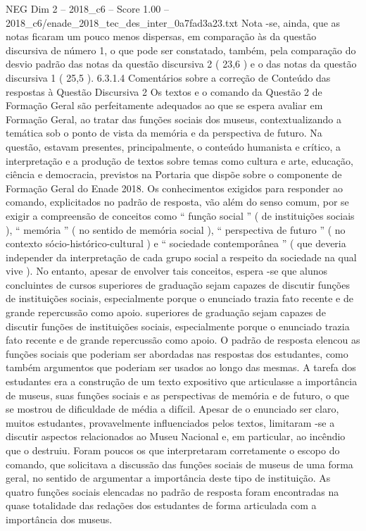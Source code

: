 \begin{textsample}{NEG Dim 2 – 2018\_c6 – Score 1.00 – 2018\_c6/enade\_2018\_tec\_des\_inter\_0a7fad3a23.txt}
Nota -se, ainda, que as notas ficaram um pouco menos dispersas, em comparação às da questão discursiva de número 1, o que pode ser constatado, também, pela comparação do desvio padrão das notas da questão discursiva 2 ( 23,6 ) e o das notas da questão discursiva 1 ( 25,5 ). 6.3.1.4 Comentários sobre a correção de Conteúdo das respostas à Questão Discursiva 2 Os textos e o comando da Questão 2 de Formação Geral são perfeitamente adequados ao que se espera avaliar em Formação Geral, ao tratar das funções sociais dos museus, contextualizando a temática sob o ponto de vista da memória e da perspectiva de futuro.
Na questão, estavam presentes, principalmente, o conteúdo humanista e crítico, a interpretação e a produção de textos sobre temas como cultura e arte, educação, ciência e democracia, previstos na Portaria que dispõe sobre o componente de Formação Geral do Enade 2018.
Os conhecimentos exigidos para responder ao comando, explicitados no padrão de resposta, vão além do senso comum, por se exigir a compreensão de conceitos como “ função social ” ( de instituições sociais ), “ memória ” ( no sentido de memória social ), “ perspectiva de futuro ” ( no contexto sócio-histórico-cultural ) e “ sociedade contemporânea ” ( que deveria independer da interpretação de cada grupo social a respeito da sociedade na qual vive ).
No entanto, apesar de envolver tais conceitos, espera -se que alunos concluintes de cursos superiores de graduação sejam capazes de discutir funções de instituições sociais, especialmente porque o enunciado trazia fato recente e de grande repercussão como apoio. superiores de graduação sejam capazes de discutir funções de instituições sociais, especialmente porque o enunciado trazia fato recente e de grande repercussão como apoio.
O padrão de resposta elencou as funções sociais que poderiam ser abordadas nas respostas dos estudantes, como também argumentos que poderiam ser usados ao longo das mesmas.
A tarefa dos estudantes era a construção de um texto expositivo que articulasse a importância de museus, suas funções sociais e as perspectivas de memória e de futuro, o que se mostrou de dificuldade de média a difícil.
Apesar de o enunciado ser claro, muitos estudantes, provavelmente influenciados pelos textos, limitaram -se a discutir aspectos relacionados ao Museu Nacional e, em particular, ao incêndio que o destruiu.
Foram poucos os que interpretaram corretamente o escopo do comando, que solicitava a discussão das funções sociais de museus de uma forma geral, no sentido de argumentar a importância deste tipo de instituição.
As quatro funções sociais elencadas no padrão de resposta foram encontradas na quase totalidade das redações dos estudantes de forma articulada com a importância dos museus.

\end{textsample}

